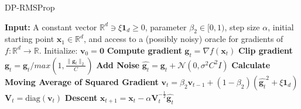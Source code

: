 \begin{algorithm}
    \caption{DP-RMSProp}
    \label{alg:rmsprop}
    \begin{algorithmic}[1]
        \State \textbf{Input:} A constant vector $\mathbb{R}^d \ni \xi \mathbf{1}_d \geq 0$, parameter $\beta_2 \in [0, 1)$, step size $\alpha$, initial starting point $\mathbf{x}_1 \in \mathbb{R}^d$, and access to a (possibly noisy) oracle for gradients of $f : \mathbb{R}^d \rightarrow \mathbb{R}$.
            \State Initialize: $\mathbf{v}_0 = \mathbf{0}$
                \State \textbf{Compute gradient}
                \State $\mathbf{g}_t = \nabla f(\mathbf{x}_t)$
                \State \textbf{Clip gradient}
                \State $\mathbf{g}_t = \mathbf{g}_t/max(1, \frac{\lVert \mathbf{g}_t \rVert_{2} }{C})$
                \State \textbf{Add Noise}
                \State $\hat{\mathbf{g}_t} = \mathbf{g}_t + \mathcal{N}(0,\sigma^{2}C^{2}I)$
                \State \textbf{Calculate Moving Average of Squared Gradient}
                \State $\mathbf{v}_t = \beta_2 \mathbf{v}_{t-1} + (1 - \beta_2)(\hat{\mathbf{g}_t}^2 + \xi \mathbf{1}_d)$
                \State $\mathbf{V}_t = \text{diag}(\mathbf{v}_t)$
                \State \textbf{Descent}
                \State $\mathbf{x}_{t+1} = \mathbf{x}_t - \alpha \mathbf{V}_t^{-\frac{1}{2}} \hat{\mathbf{g}_t}$
            \EndFor
        \EndFunction
    \end{algorithmic}
\end{algorithm}
\vspace{-1cm}

